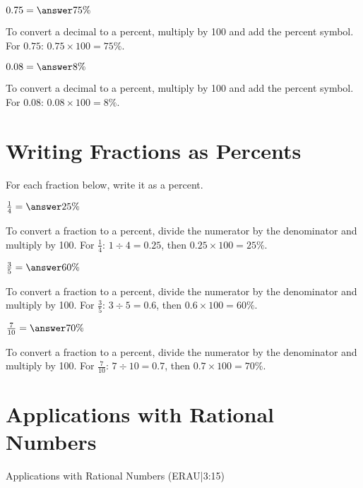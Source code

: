 \documentclass{ximera}
\begin{document}
\begin{problem}
$0.75 = \answer{75\%}$

\begin{feedback}
To convert a decimal to a percent, multiply by 100 and add the percent symbol. For $0.75$: $0.75 \times 100 = 75\%$.
\end{feedback}

\end{problem}

\begin{problem}
$0.08 = \answer{8\%}$

\begin{feedback}
To convert a decimal to a percent, multiply by 100 and add the percent symbol. For $0.08$: $0.08 \times 100 = 8\%$.
\end{feedback}

\end{problem}



\section*{Writing Fractions as Percents}

For each fraction below, write it as a percent.

\begin{problem}
$\frac{1}{4} = \answer{25\%}$

\begin{feedback}
To convert a fraction to a percent, divide the numerator by the denominator and multiply by 100. For $\frac{1}{4}$: $1 \div 4 = 0.25$, then $0.25 \times 100 = 25\%$.
\end{feedback}

\end{problem}

\begin{problem}
$\frac{3}{5} = \answer{60\%}$

\begin{feedback}
To convert a fraction to a percent, divide the numerator by the denominator and multiply by 100. For $\frac{3}{5}$: $3 \div 5 = 0.6$, then $0.6 \times 100 = 60\%$.
\end{feedback}

\end{problem}

\begin{problem}
$\frac{7}{10} = \answer{70\%}$

\begin{feedback}
To convert a fraction to a percent, divide the numerator by the denominator and multiply by 100. For $\frac{7}{10}$: $7 \div 10 = 0.7$, then $0.7 \times 100 = 70\%$.
\end{feedback}

\end{problem}


\section*{Applications with Rational Numbers} 

Applications with Rational Numbers (ERAU|3:15)

\end{document}
